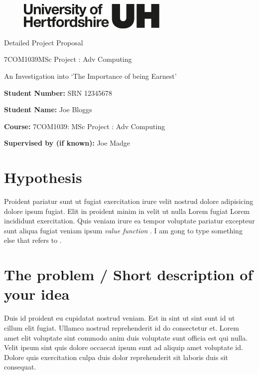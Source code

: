 \documentclass[a4paper, notitlepage, 11pt]{article}
\newcommand{\projecttitle}{An Investigation into `The Importance of being Earnest'}
\newcommand{\studentname}{Joe Bloggs}
\newcommand{\studentnumber}{SRN 12345678}
\newcommand{\supervisorname}{Joe Madge}
\newcommand{\doctype}{Detailed Project Proposal}
\newcommand{\coursecode}{7COM1039}
\newcommand{\coursedescr}{MSc Project : Adv Computing}
\begin{document}
\begin{figure}
    \vspace{-3mm}
    \includegraphics[width=7.2cm]{herts-logo-black.png}
\end{figure}
\noindent \huge{\doctype}\par
\vspace{-0.5em} \large \coursecode \newline \coursedescr \par

\onehalfspacing

\vspace{2em}
\begin{tcolorbox}[width=\textwidth]
    \vspace{2em}
    \begin{center}
        {\Large \projecttitle} \newline
    \end{center}
    \vspace{2em}
    
    \textbf{Student Number:} \studentnumber \par 
    \textbf{Student Name:} \studentname \par
    \vspace{2em}
    
    \textbf{Course:} \coursecode : \coursedescr \par
    \textbf{Supervised by (if known):} \supervisorname
\end{tcolorbox}


\section{Hypothesis}
Proident pariatur sunt ut fugiat exercitation irure velit nostrud dolore adipisicing dolore ipsum fugiat. Elit in proident minim in velit ut nulla Lorem fugiat Lorem incididunt exercitation. Quis veniam irure ea tempor voluptate pariatur excepteur sunt aliqua fugiat veniam ipsum \emph{value function}  \citep{Sutton2018}.  I am gong to type something else that refers to \citep{Callaway2018:resource-rational-planning}.

\section{The problem / Short description of your idea}
Duis id proident eu cupidatat nostrud veniam. Est in sint ut sint sunt id ut cillum elit fugiat. Ullamco nostrud reprehenderit id do consectetur et. Lorem amet elit voluptate sint commodo anim duis voluptate sunt officia est qui nulla. Velit ipsum sint quis dolore occaecat ipsum sunt ad aliquip amet voluptate id. Dolore quis exercitation culpa duis dolor reprehenderit sit laboris duis sit consequat.
\end{document}
